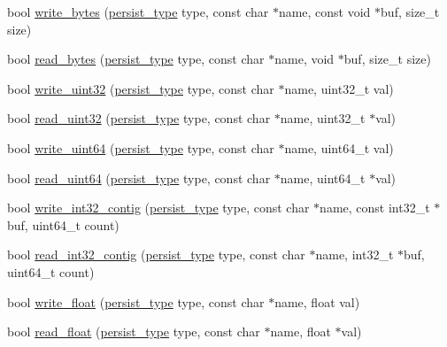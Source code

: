 \begin{DoxyCompactItemize}
bool \hyperlink{classlbann_1_1persist_a8729c7c90f4ca3090cd678fce91a0eb0}{write\+\_\+bytes} (\hyperlink{namespacelbann_adee41f31f15f3906cbdcce4a1417eb56}{persist\+\_\+type} type, const char $\ast$name, const void $\ast$buf, size\+\_\+t size)
\item 
bool \hyperlink{classlbann_1_1persist_af24f635f634c8cf30cf53a0e90ec641b}{read\+\_\+bytes} (\hyperlink{namespacelbann_adee41f31f15f3906cbdcce4a1417eb56}{persist\+\_\+type} type, const char $\ast$name, void $\ast$buf, size\+\_\+t size)
\item 
bool \hyperlink{classlbann_1_1persist_a742334568de0aca958dbaf7bbabd3cba}{write\+\_\+uint32} (\hyperlink{namespacelbann_adee41f31f15f3906cbdcce4a1417eb56}{persist\+\_\+type} type, const char $\ast$name, uint32\+\_\+t val)
\item 
bool \hyperlink{classlbann_1_1persist_ace1ebb58e2570693cdce0ebd2817113b}{read\+\_\+uint32} (\hyperlink{namespacelbann_adee41f31f15f3906cbdcce4a1417eb56}{persist\+\_\+type} type, const char $\ast$name, uint32\+\_\+t $\ast$val)
\item 
bool \hyperlink{classlbann_1_1persist_aced95e3bc711276b072af97b65ef9fc1}{write\+\_\+uint64} (\hyperlink{namespacelbann_adee41f31f15f3906cbdcce4a1417eb56}{persist\+\_\+type} type, const char $\ast$name, uint64\+\_\+t val)
\item 
bool \hyperlink{classlbann_1_1persist_aa6d996db3714a7ae055adac0d8e8ac63}{read\+\_\+uint64} (\hyperlink{namespacelbann_adee41f31f15f3906cbdcce4a1417eb56}{persist\+\_\+type} type, const char $\ast$name, uint64\+\_\+t $\ast$val)
\item 
bool \hyperlink{classlbann_1_1persist_a199cd86b1e1f0fd5f2d0458fc6d25828}{write\+\_\+int32\+\_\+contig} (\hyperlink{namespacelbann_adee41f31f15f3906cbdcce4a1417eb56}{persist\+\_\+type} type, const char $\ast$name, const int32\+\_\+t $\ast$buf, uint64\+\_\+t count)
\item 
bool \hyperlink{classlbann_1_1persist_a2944c32f6634223c0902b38a697a0957}{read\+\_\+int32\+\_\+contig} (\hyperlink{namespacelbann_adee41f31f15f3906cbdcce4a1417eb56}{persist\+\_\+type} type, const char $\ast$name, int32\+\_\+t $\ast$buf, uint64\+\_\+t count)
\item 
bool \hyperlink{classlbann_1_1persist_ab5be1e98f9d962c41fc9c3f2ac918c6e}{write\+\_\+float} (\hyperlink{namespacelbann_adee41f31f15f3906cbdcce4a1417eb56}{persist\+\_\+type} type, const char $\ast$name, float val)
\item 
bool \hyperlink{classlbann_1_1persist_ac5e659a6612e5f2911e195fc1b6c045b}{read\+\_\+float} (\hyperlink{namespacelbann_adee41f31f15f3906cbdcce4a1417eb56}{persist\+\_\+type} type, const char $\ast$name, float $\ast$val)

\end{DoxyCompactItemize}
